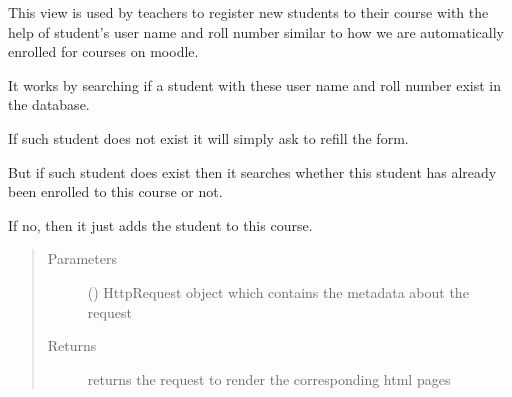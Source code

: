 \documentclass[letterpaper,10pt,english]{sphinxmanual}
\begin{document}
\begin{fulllineitems}
\label{\detokenize{users:users.views.reg_student}}
\sphinxAtStartPar
This view is used by teachers to register new students to their course with the help of student’s user name and roll number similar to how we are automatically enrolled for courses on moodle.

\sphinxAtStartPar
It works by searching if a student with these user name and roll number exist in the database.

\sphinxAtStartPar
If such student does not exist it will simply ask to refill the form.

\sphinxAtStartPar
But if such student does exist then it searches whether this student has already been enrolled to this course or not.

\sphinxAtStartPar
If no, then it just adds the student to this course.
\begin{quote}\begin{description}
\item[{Parameters}] \leavevmode
\sphinxAtStartPar
{} () \textendash{} HttpRequest object which contains the metadata about the request

\item[{Returns}] \leavevmode
\sphinxAtStartPar
returns the request to render the corresponding html pages

\end{description}\end{quote}

\end{fulllineitems}

\end{document}
